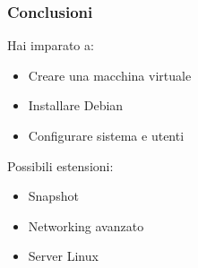 \documentclass{beamer}
\begin{document}
	
	\begin{frame}
		\frametitle{Conclusioni}
		
		Hai imparato a:
		\begin{itemize}
			\item Creare una macchina virtuale
			\item Installare Debian
			\item Configurare sistema e utenti
		\end{itemize}
		
		Possibili estensioni:
		\begin{itemize}
			\item Snapshot
			\item Networking avanzato
			\item Server Linux
		\end{itemize}
		
	\end{frame}
	
	
\end{document}
